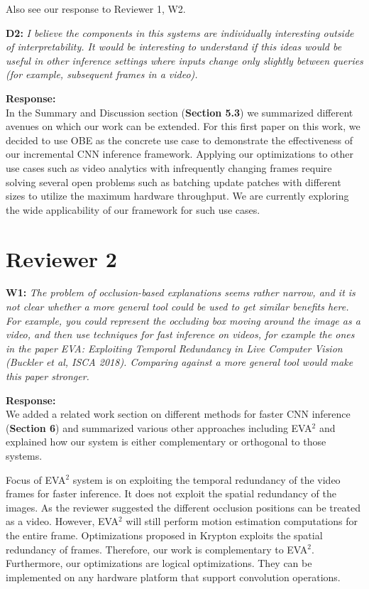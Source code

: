 \documentclass[preprint]{vldb}
\begin{document}
Also see our response to Reviewer 1, W2.

\vspace{2mm}
\noindent \textbf{D2:} \textit{I believe the components in this systems are individually interesting outside of interpretability. It would be interesting to understand if this ideas would be useful in other inference settings where inputs change only slightly between queries (for example, subsequent frames in a video).}

\vspace{2mm}
\noindent \textbf{Response:} \\
In the Summary and Discussion section (\textbf{Section 5.3}) we summarized different avenues on which our work can be extended.
For this first paper on this work, we decided to use OBE as the concrete use case to demonstrate the effectiveness of our incremental CNN inference framework.
Applying our optimizations to other use cases such as video analytics with infrequently changing frames require solving several open problems such as batching update patches with different sizes to utilize the maximum hardware throughput.
We are currently exploring the wide applicability of our framework for such use cases.


\section{Reviewer 2}

\vspace{2mm}
\noindent \textbf{W1:} \textit{The problem of occlusion-based explanations seems rather narrow, and it is not clear whether a more general tool could be used to get similar benefits here. For example, you could represent the occluding box moving around the image as a video, and then use techniques for fast inference on videos, for example the ones in the paper EVA: Exploiting Temporal Redundancy in Live Computer Vision (Buckler et al, ISCA 2018). Comparing against a more general tool would make this paper stronger.}

\vspace{2mm}
\noindent \textbf{Response:}\\
We added a related work section on different methods for faster CNN inference (\textbf{Section 6}) and summarized various other approaches including EVA$^2$ and explained how our system is either complementary or orthogonal to those systems.

Focus of EVA$^2$ system is on exploiting the temporal redundancy of the video frames for faster inference. It does not exploit the spatial redundancy of the images. As the reviewer suggested the different occlusion positions can be treated as a video. However, EVA$^2$ will still perform motion estimation computations for the entire frame. Optimizations proposed in Krypton exploits the spatial redundancy of frames. Therefore, our work is complementary to EVA$^2$.
Furthermore, our optimizations are logical optimizations. They can be implemented on any hardware platform that support convolution operations.
\end{document}
